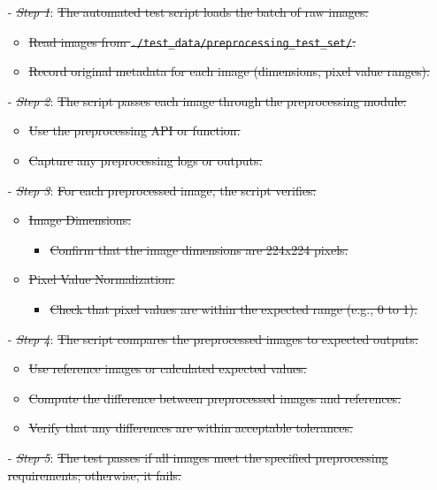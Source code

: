\documentclass[12pt, titlepage]{article}
\begin{document}
\begin{enumerate}
\begin{itemize}
  \item[-] \textit{\sout{Step 1}}: \sout{The automated test script loads the batch of raw images:}
    \begin{itemize}
      \item \sout{Read images from \texttt{./test\_data/preprocessing\_test\_set/}.}
      \item \sout{Record original metadata for each image (dimensions, pixel value ranges).}
    \end{itemize}
  \item[-] \textit{\sout{Step 2}}: \sout{The script passes each image through the preprocessing module:}
    \begin{itemize}
      \item \sout{Use the preprocessing API or function.}
      \item \sout{Capture any preprocessing logs or outputs.}
    \end{itemize}
  \item[-] \textit{\sout{Step 3}}: \sout{For each preprocessed image, the script verifies:}
    \begin{itemize}
      \item \sout{Image Dimensions:}
        \begin{itemize}
          \item \sout{Confirm that the image dimensions are 224x224 pixels.}
        \end{itemize}
      \item \sout{Pixel Value Normalization:}
        \begin{itemize}
          \item \sout{Check that pixel values are within the expected range (e.g., 0 to 1).}
        \end{itemize}
    \end{itemize}
  \item[-] \textit{\sout{Step 4}}: \sout{The script compares the preprocessed images to expected outputs:}
    \begin{itemize}
      \item \sout{Use reference images or calculated expected values.}
      \item \sout{Compute the difference between preprocessed images and references.}
      \item \sout{Verify that any differences are within acceptable tolerances.}
    \end{itemize}
  \item[-] \textit{\sout{Step 5}}: \sout{The test passes if all images meet the specified preprocessing requirements; otherwise, it fails.}
\end{itemize}


\end{enumerate}
\end{document}
